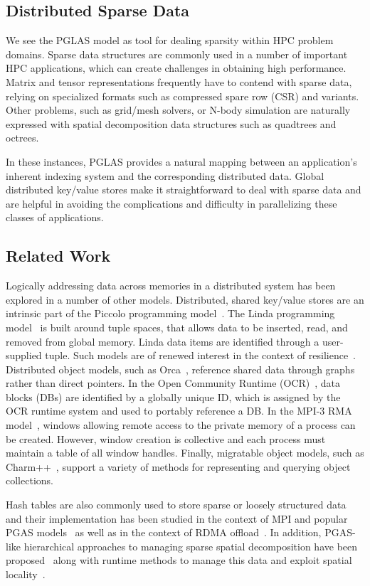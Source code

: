 \subsection{Distributed Sparse Data}

We see the PGLAS model as tool for dealing sparsity within HPC problem domains.  
Sparse data structures are commonly used in a number of important HPC 
applications, which can create challenges in obtaining high performance. Matrix 
and tensor representations frequently have to contend with sparse data, 
relying on specialized formats such as compressed spare row (CSR) and variants.  
Other problems, such as grid/mesh solvers, or N-body simulation are naturally 
expressed with spatial decomposition data structures such as quadtrees and 
octrees. 

In these instances, PGLAS provides a natural mapping between an application's 
inherent indexing system and the corresponding distributed data. Global 
distributed key/value stores make it straightforward to deal with sparse data 
and are helpful in avoiding the complications and difficulty in parallelizing 
these classes of applications.

\subsection{Related Work} 

Logically addressing data across memories in a distributed
system has been explored in a number of other models.  Distributed,
shared key/value stores are an intrinsic part of the Piccolo
programming model~\cite{power:10}.  The Linda programming
model~\cite{ahuja:86} is built around tuple spaces, that allows data
to be inserted, read, and removed from global memory. Linda data items
are identified through a user-supplied tuple.  Such models are of
renewed interest in the context of resilience~\cite{wilke:14}.
Distributed object models, such as Orca~\cite{bal:92}, reference
shared data through graphs rather than direct pointers.  In the Open
Community Runtime (OCR)~\cite{OCR}, data blocks (DBs) are identified
by a globally unique ID, which is assigned by the OCR runtime system
and used to portably reference a DB.  In the MPI-3 RMA 
model~\cite{mpi-forum:15}, windows allowing remote
access to the private memory of a process can be created.  However,
window creation is collective and each process must maintain a table of
all window handles.  Finally, migratable object
models, such as Charm++~\cite{kale:93}, support a variety of methods
for representing and querying object collections.

Hash tables are also commonly used to store sparse or loosely structured
data~\cite{memcached04,chord01,docan:12}
and their implementation has been studied in the context of MPI and popular PGAS
models~\cite{zht13,fompi13,cmpi10,maynard:12,memcached12,mht15} as well as in
the context of RDMA offload~\cite{memcached12,mitchell:13,kalia:14}.  In
addition, PGAS-like hierarchical approaches to
managing sparse spatial decomposition have been proposed~\cite{larkins:08}
along with runtime methods to manage this data and exploit spatial
locality~\cite{larkins:12}.


